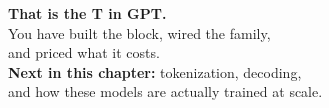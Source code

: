 \documentclass[aspectratio=169]{beamer}
\begin{document}
\begin{frame}[plain]
  \vfill
  \begin{center}
    {\Large\bfseries\color{popblue} That is the T in GPT.}\\[0.9em]
    {\large You have built the block, wired the family,}\\[0.25em]
    {\large and priced what it costs.}\\[1.3em]
    {\large\color{paramgreen}\textbf{Next in this chapter:} tokenization, decoding,}\\[0.2em]
    {\large\color{paramgreen}and how these models are actually trained at scale.}
  \end{center}
  \vfill
\end{frame}
\end{document}
